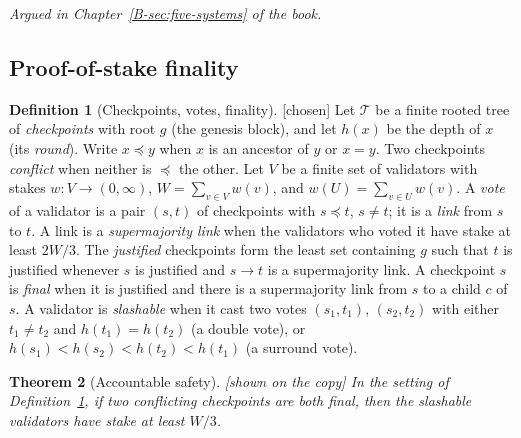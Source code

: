 \documentclass[11pt, a4paper]{article}
\theoremstyle{plain}
\newtheorem{theorem}{Theorem}[section]
\theoremstyle{definition}
\newtheorem{definition}[theorem]{Definition}
\theoremstyle{remark}
\newcommand{\argued}[1]{\par\noindent\textit{Argued in Chapter~\ref{B-#1} of the book.}\par}
\newcommand{\kind}[1]{\textup{[#1]}}
\begin{document}
\argued{sec:five-systems}

\subsection*{Proof-of-stake finality}

\begin{definition}[Checkpoints, votes, finality]\label{spec:casper-def} \kind{chosen}
Let $\mathcal T$ be a finite rooted tree of \emph{checkpoints} with root $g$ (the genesis block), and let
$h(x)$ be the depth of $x$ (its \emph{round}). Write $x\preceq y$ when $x$ is an ancestor of $y$ or $x=y$.
Two checkpoints \emph{conflict} when neither is $\preceq$ the other. Let $V$ be a finite set of validators
with stakes $w:V\to(0,\infty)$, $W=\sum_{v\in V}w(v)$, and $w(U)=\sum_{v\in U}w(v)$. A \emph{vote} of a
validator is a pair $(s,t)$ of checkpoints with $s\preceq t$, $s\ne t$; it is a \emph{link} from $s$ to $t$.
A link is a \emph{supermajority link} when the validators who voted it have stake at least $2W/3$. The
\emph{justified} checkpoints form the least set containing $g$ such that $t$ is justified whenever $s$ is
justified and $s\to t$ is a supermajority link. A checkpoint $s$ is \emph{final} when it is justified and
there is a supermajority link from $s$ to a child $c$ of $s$. A validator is \emph{slashable} when it cast two
votes $(s_1,t_1)$, $(s_2,t_2)$ with either $t_1\ne t_2$ and $h(t_1)=h(t_2)$ (a double vote), or
$h(s_1)<h(s_2)<h(t_2)<h(t_1)$ (a surround vote).
\end{definition}

\begin{theorem}[Accountable safety]\label{spec:casper} \kind{shown on the copy}
In the setting of Definition~\ref{spec:casper-def}, if two conflicting checkpoints are both final, then the
slashable validators have stake at least $W/3$.
\end{theorem}
\end{document}
